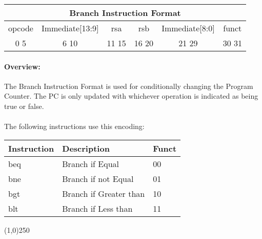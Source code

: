 \documentclass[letterpaper, 11pt]{article}
\begin{document}
\begin{center}
		\begin{tabular}{|c|c|c|c|c|c|}
			\multicolumn{6}{c}{Branch Instruction Format}\\ \hline
			\hspace{2pt} opcode \hspace{2pt} & \hspace{5pt} Immediate[13:9] \hspace{5pt} &  \hspace{4pt} rsa \hspace{4pt} & \hspace{4pt}rsb  \hspace{4pt}& \hspace{10pt}Immediate[8:0]  \hspace{10pt} & \hspace{3pt} funct \hspace{3pt}   \\	\hline
			0 \hfill 5&6 \hfill 10&11 \hfill  15&16 \hfill 20&21 \hfill   29&30 \hfill 31\\ \hline
		
	\end{tabular}
\end{center}
\paragraph{Overview:} The Branch Instruction Format is used for conditionally changing the Program Counter.
The PC is only updated with whichever operation is indicated as being true or false.\\
\paragraph{}The following instructions use this encoding: \\
\begin{center}
	\begin{tabular}{|l|l|l|} \hline
			Instruction & Description 				& Funct\\ \hline
			beq			& Branch if Equal			& 00 \\ \hline
			bne			& Branch if not Equal		& 01 \\ \hline
			bgt			& Branch if Greater than	& 10 \\ \hline
			blt			& Branch if Less than		& 11 \\ \hline

\end{tabular}
\end{center}
\begin{center}
	\line(1,0){250}
\end{center}
\end{document}
